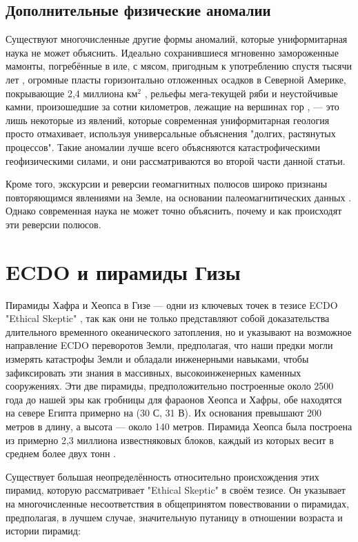 \documentclass[10pt,twocolumn,letterpaper]{article}
\begin{document}
\subsection{Дополнительные физические аномалии}

Существуют многочисленные другие формы аномалий, которые униформитарная наука не может объяснить. Идеально сохранившиеся мгновенно замороженные мамонты, погребённые в иле, с мясом, пригодным к употреблению спустя тысячи лет \cite{17,18,19}, огромные пласты горизонтально отложенных осадков в Северной Америке, покрывающие 2,4 миллиона км$^2$ \cite{21}, рельефы мега-текущей ряби \cite{22} и неустойчивые камни, произошедшие за сотни километров, лежащие на вершинах гор \cite{23,26}, — это лишь некоторые из явлений, которые современная униформитарная геология просто отмахивает, используя универсальные объяснения "долгих, растянутых процессов". Такие аномалии лучше всего объясняются катастрофическими геофизическими силами, и они рассматриваются во второй части данной статьи.

Кроме того, экскурсии и реверсии геомагнитных полюсов широко признаны повторяющимся явлениями на Земле, на основании палеомагнитических данных \cite{35,40,41}. Однако современная наука не может точно объяснить, почему и как происходят эти реверсии полюсов.

\section{ECDO и пирамиды Гизы}

Пирамиды Хафра и Хеопса в Гизе — одни из ключевых точек в тезисе ECDO "Ethical Skeptic" \cite{27}, так как они не только представляют собой доказательства длительного временного океанического затопления, но и указывают на возможное направление ECDO переворотов Земли, предполагая, что наши предки могли измерять катастрофы Земли и обладали инженерными навыками, чтобы зафиксировать эти знания в массивных, высокоинженерных каменных сооружениях. Эти две пирамиды, предположительно построенные около 2500 года до нашей эры как гробницы для фараонов Хеопса и Хафры, обе находятся на севере Египта примерно на (30 С, 31 В). Их основания превышают 200 метров в длину, а высота — около 140 метров. Пирамида Хеопса была построена из примерно 2,3 миллиона известняковых блоков, каждый из которых весит в среднем более двух тонн \cite{24, 25}.

Существует большая неопределённость относительно происхождения этих пирамид, которую рассматривает "Ethical Skeptic" в своём тезисе. Он указывает на многочисленные несоответствия в общепринятом повествовании о пирамидах, предполагая, в лучшем случае, значительную путаницу в отношении возраста и истории пирамид:
\end{document}
